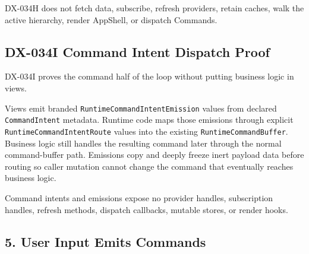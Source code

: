 

DX-034H does not fetch data, subscribe, refresh providers, retain caches, walk the active hierarchy, render AppShell, or dispatch Commands.

\subsection{DX-034I Command Intent Dispatch Proof}\label{record-132-dx-034i-command-intent-dispatch-proof}

DX-034I proves the command half of the loop without putting business logic in views.

Views emit branded \texttt{R\allowbreak{}u\allowbreak{}n\allowbreak{}t\allowbreak{}i\allowbreak{}m\allowbreak{}e\allowbreak{}C\allowbreak{}o\allowbreak{}m\allowbreak{}m\allowbreak{}a\allowbreak{}n\allowbreak{}d\allowbreak{}I\allowbreak{}n\allowbreak{}t\allowbreak{}e\allowbreak{}n\allowbreak{}t\allowbreak{}E\allowbreak{}m\allowbreak{}i\allowbreak{}s\allowbreak{}s\allowbreak{}i\allowbreak{}o\allowbreak{}n} values from declared \texttt{C\allowbreak{}o\allowbreak{}m\allowbreak{}m\allowbreak{}a\allowbreak{}n\allowbreak{}d\allowbreak{}I\allowbreak{}n\allowbreak{}t\allowbreak{}e\allowbreak{}n\allowbreak{}t} metadata. Runtime code maps those emissions through explicit \texttt{R\allowbreak{}u\allowbreak{}n\allowbreak{}t\allowbreak{}i\allowbreak{}m\allowbreak{}e\allowbreak{}C\allowbreak{}o\allowbreak{}m\allowbreak{}m\allowbreak{}a\allowbreak{}n\allowbreak{}d\allowbreak{}I\allowbreak{}n\allowbreak{}t\allowbreak{}e\allowbreak{}n\allowbreak{}t\allowbreak{}R\allowbreak{}o\allowbreak{}u\allowbreak{}t\allowbreak{}e} values into the existing \texttt{R\allowbreak{}u\allowbreak{}n\allowbreak{}t\allowbreak{}i\allowbreak{}m\allowbreak{}e\allowbreak{}C\allowbreak{}o\allowbreak{}m\allowbreak{}m\allowbreak{}a\allowbreak{}n\allowbreak{}d\allowbreak{}B\allowbreak{}u\allowbreak{}f\allowbreak{}f\allowbreak{}e\allowbreak{}r}. Business logic still handles the resulting command later through the normal command-buffer path. Emissions copy and deeply freeze inert payload data before routing so caller mutation cannot change the command that eventually reaches business logic.



Command intents and emissions expose no provider handles, subscription handles, refresh methods, dispatch callbacks, mutable stores, or render hooks.

\subsection{5. User Input Emits Commands}\label{record-132-user-input-emits-commands}

